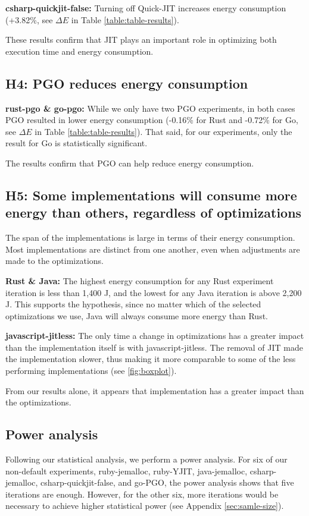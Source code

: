 \documentclass[main.tex]{subfiles}
\begin{document}
\textbf{csharp-quickjit-false:} Turning off Quick-JIT increases energy consumption (+3.82\%, see $\Delta E$ in Table \ref{table:table-results}).

These results confirm that JIT plays an important role in optimizing both execution time and energy consumption.

\subsection{H4: PGO reduces energy consumption}

\textbf{rust-pgo \& go-pgo:} While we only have two PGO experiments, in both cases PGO resulted in lower energy consumption (-0.16\% for Rust and -0.72\% for Go, see $\Delta E$ in Table \ref{table:table-results}). That said, for our experiments, only the result for Go is statistically significant.

The results confirm that PGO can help reduce energy consumption.


\subsection{H5: Some implementations will consume more energy than others, regardless of optimizations}

The span of the implementations is large in terms of their energy consumption. Most implementations are distinct from one another, even when adjustments are made to the optimizations.

\textbf{Rust \& Java:} The highest energy consumption for any Rust experiment iteration is less than 1,400 J, and the lowest for any Java iteration is above 2,200 J. This supports the hypothesis, since no matter which of the selected optimizations we use, Java will always consume more energy than Rust.

\textbf{javascript-jitless:} The only time a change in optimizations has a greater impact than the implementation itself is with javascript-jitless. The removal of JIT made the implementation slower, thus making it more comparable to some of the less performing implementations (see \ref{fig:boxplot}). 

From our results alone, it appears that implementation has a greater impact than the optimizations. 

\subsection{Power analysis}
Following our statistical analysis, we perform a power analysis. For six of our non-default experiments, ruby-jemalloc, ruby-YJIT, java-jemalloc, csharp-jemalloc, csharp-quickjit-false, and go-PGO, the power analysis shows that five iterations are enough. However, for the other six, more iterations would be necessary to achieve higher statistical power (see Appendix \ref{sec:samle-size}).
\end{document}
